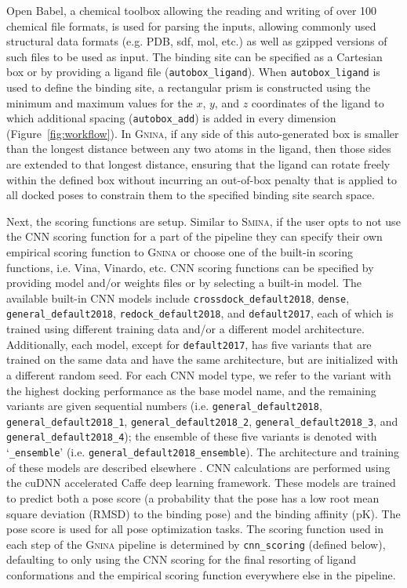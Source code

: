 \documentclass[journal=jcisd8,manuscript=article]{achemso}
\begin{document}
Open Babel\cite{o2011open,babelopen}, a chemical toolbox allowing the reading and writing of over 100 chemical file formats, is used for parsing the inputs, allowing commonly used structural data formats (e.g. PDB, sdf, mol, etc.) as well as gzipped versions of such files to be used as input. The binding site can be specified as a Cartesian box or by providing a ligand file (\texttt{autobox\_ligand}).  When \texttt{autobox\_ligand} is used to define the binding site, a rectangular prism is constructed using the minimum and maximum values for the $x$, $y$, and $z$ coordinates of the ligand to which additional spacing (\texttt{autobox\_add}) is added in every dimension (Figure~\ref{fig:workflow}). In \textsc{Gnina}, if any side of this auto-generated box is smaller than the longest distance between any two atoms in the ligand, then those sides are extended to that longest distance, ensuring that the ligand can rotate freely within the defined box without incurring an out-of-box penalty that is applied to all docked poses to constrain them to the specified binding site search space.

Next, the scoring functions are setup. Similar to \textsc{Smina}, if the user opts to not use the CNN scoring function for a part of the pipeline they can specify their own empirical scoring function to \textsc{Gnina} or choose one of the built-in scoring functions, i.e. Vina, Vinardo\cite{quiroga2016vinardo}, etc. CNN scoring functions can be specified by providing model and/or weights files or by selecting a built-in model.  The available built-in CNN models include \texttt{crossdock\_default2018}, \texttt{dense}, \texttt{general\_default2018}, \texttt{redock\_default2018}, and \texttt{default2017}, each of which is trained using different training data and/or a different model architecture. Additionally, each model, except for \texttt{default2017}, has five variants that are trained on the same data and have the same architecture, but are initialized with a different random seed. For each CNN model type, we refer to the variant with the highest docking performance as the base model name, and the remaining variants are given sequential numbers (i.e. \texttt{general\_default2018}, \texttt{general\_default2018\_1}, \texttt{general\_default2018\_2}, \texttt{general\_{\allowbreak}default2018\_3}, and \texttt{general\_{\allowbreak}default2018\_4}); the ensemble of these five variants is denoted with `\texttt{\_ensemble}' (i.e. \texttt{general\_{\allowbreak}default2018\_ensemble}). The architecture and training of these models are described elsewhere \cite{francoeur2020three,Ragoza2017}. CNN calculations are performed using the cuDNN accelerated Caffe deep learning framework\cite{jia2014caffe}. These models are trained to predict both a pose score (a probability that the pose has a low root mean square deviation (RMSD) to the binding pose) and the binding affinity (pK). The pose score is used for all pose optimization tasks. The scoring function used in each step of the \textsc{Gnina} pipeline is determined by \texttt{cnn\_scoring} (defined below), defaulting to only using the CNN scoring for the final resorting of ligand conformations and the empirical scoring function everywhere else in the pipeline. 
\end{document}
